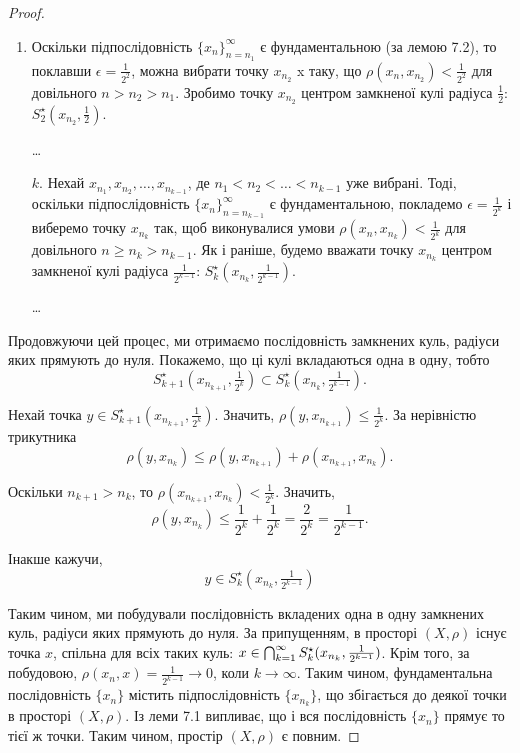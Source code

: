 \begin{proof}
\begin{enumerate}
\item Оскільки підпослідовність $\{x_n\}_{n = n_1}^\infty$
є фундаментальною (за лемою 7.2), то поклавши $\epsilon = \frac{1}{2^2}$,
можна вибрати точку $x_{n_2}$ x таку, що 
$\rho(x_n, x_{n_2}) < \frac{1}{2^2}$ для довільного
$n > n_2 > n_1$. Зробимо точку
$x_{n_2}$ центром замкненої кулі
радіуса $\frac{1}{2}$: $S_2^\star(x_{n_2}, \frac{1}{2})$.

\dots

\item[$k$.] Нехай $x_{n_1}, x_{n_2}, \dots, x_{n_{k - 1}}$,
де $n_1 < n_2 < \dots < n_{k - 1}$ уже вибрані.
Тоді, оскільки підпослідовність $\{x_n\}_{n = n_{k - 1}}^\infty$
є фундаментальною, покладемо $\epsilon = \frac{1}{2^k}$ і виберемо
точку $x_{n_k}$ так, щоб виконувалися умови 
$\rho(x_n, x_{n_k}) < \frac{1}{2^k}$
для довільного $n \ge n_k > n_{k - 1}$. Як і раніше, будемо
вважати точку $x_{n_k}$ центром замкненої кулі радіуса
$\frac{1}{2^{k - 1}}$: $S_k^\star(x_{n_k}, \frac{1}{2^{k - 1}})$.

\dots
\end{enumerate}

Продовжуючи цей процес, ми отримаємо послідовність
замкнених куль, радіуси яких прямують до нуля. Покажемо,
що ці кулі вкладаються одна в одну, тобто
\begin{equation*}
    S_{k + 1}^\star ( x_{n_{k + 1}}, \tfrac{1}{2^k} ) \subset
    S_k^\star ( x_{n_k}, \tfrac{1}{2^{k - 1}} ).
\end{equation*}

Нехай точка $y \in S_{k + 1}^\star ( x_{n_{k + 1}}, \tfrac{1}{2^k} )$.
Значить, $\rho(y, x_{n_{k + 1}}) \le \frac{1}{2^k}$.
За нерівністю трикутника
\begin{equation*}
    \rho(y, x_{n_k}) \le \rho(y, x_{n_{k + 1}}) + \rho(x_{n_{k + 1}}, x_{n_k}).
\end{equation*}

Оскільки $n_{k + 1} > n_k$, то $\rho(x_{n_{k + 1}}, x_{n_k}) < \frac{1}{2^k}$. Значить,
\begin{equation*}
    \rho(y, x_{n_k}) \le \frac{1}{2^k} + \frac{1}{2^k} =
    \frac{2}{2^k} = \frac{1}{2^{k - 1}}.
\end{equation*}

Інакше кажучи,
\begin{equation*}
    y \in S_k^\star ( x_{n_k}, \tfrac{1}{2^{k - 1}} )
\end{equation*}

Таким чином, ми побудували послідовність вкладених одна
в одну замкнених куль, радіуси яких прямують до нуля.
За припущенням, в просторі $(X, \rho)$ існує точка $x$,
спільна для всіх таких куль:
$x \in \operatorname*{\bigcap}_{k = 1}^\infty S_k^\star(x_{n_k}, \frac{1}{2^{k - 1}})$. 
Крім того, за побудовою, $\rho(x_n, x) = \frac{1}{2^{k - 1}} \to 0$,
коли $k \to \infty$. Таким чином,
фундаментальна послідовність $\{x_n\}$ містить
підпослідовність $\{x_{n_k}\}$, що збігається до деякої точки в
просторі $(X, \rho)$. Із леми 7.1 випливає, що і вся
послідовність $\{x_n\}$ прямує то тієї ж точки. Таким чином,
простір $(X, \rho)$ є повним.
\end{proof}

